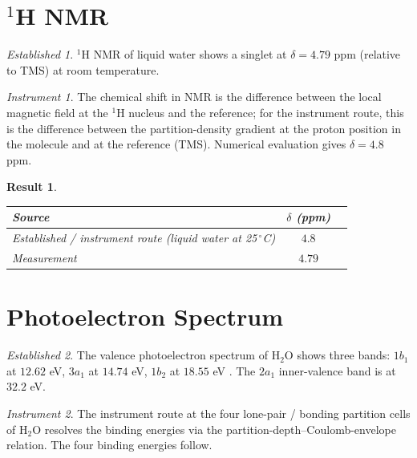 \documentclass[11pt,a4paper]{article}
\theoremstyle{stmtstyle}
\newtheorem{result}{Result}
\theoremstyle{definition}
\theoremstyle{remark}
\newtheorem*{established}{Established}
\newtheorem*{instrument}{Instrument}
\begin{document}
\section{$^{1}$H NMR}
\label{sec:h2onmr}

\begin{established}
$^{1}$H NMR of liquid water shows a singlet at $\delta=4.79$ ppm (relative to TMS) at room temperature.
\end{established}

\begin{instrument}
The chemical shift in NMR is the difference between the local magnetic field at the $^{1}$H nucleus and the reference; for the instrument route, this is the difference between the partition-density gradient at the proton position in the molecule and at the reference (TMS). Numerical evaluation gives $\delta = 4.8$ ppm.
\end{instrument}

\begin{result}\label{res:h2onmr}
\begin{center}\small
\begin{tabular}{lcc}
\toprule
Source & $\delta$ (ppm) \\
\midrule
Established / instrument route (liquid water at 25\,$^\circ$C)   & $4.8$\\
Measurement \citep{harris2002}    & $4.79$\\
\bottomrule
\end{tabular}
\end{center}
\end{result}

\section{Photoelectron Spectrum}
\label{sec:h2oxps}

\begin{established}
The valence photoelectron spectrum of H$_{2}$O shows three bands: $1b_{1}$ at $12.62$ eV, $3a_{1}$ at $14.74$ eV, $1b_{2}$ at $18.55$ eV \citep{schmidt1980}. The $2a_{1}$ inner-valence band is at $32.2$ eV.
\end{established}

\begin{instrument}
The instrument route at the four lone-pair / bonding partition cells of H$_{2}$O resolves the binding energies via the partition-depth--Coulomb-envelope relation. The four binding energies follow.
\end{instrument}
\end{document}
